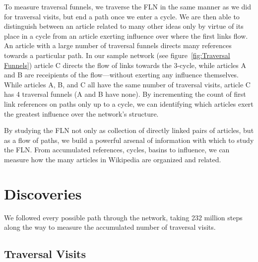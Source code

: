 \documentclass[pre,twocolumn,twoside,superscriptaddress,floatfix, aps, 10pt]{revtex4-1}
\newcommand{\green}[1]{{\leavevmode\color{javagreen}{#1}}} %
\begin{document}
To measure traversal funnels, we traverse the FLN in the same manner as we 
did for traversal visits, but end a path once we enter a cycle.
We are then able to distinguish between an article related to many other ideas
only by virtue of its place in a cycle from an article exerting influence over where the first links flow. 
An article with a large number of traversal funnels directs many references
towards a particular path. In our sample network 
(see figure~\ref{fig:Traversal Funnels}) article C 
directs the flow of links towards the 3-cycle, while articles A and B are 
receipients of the flow---without exerting any influence themselves. 
While articles A, B, and C all have the same number of traversal visits, 
article C has 4 traversal funnels (A and B have none). By incrementing the count of 
first link references on paths only up to a cycle, we can identifying which articles
exert the greatest influence over the network's structure.

By studying the FLN not only as collection of directly linked pairs of articles, but
as a flow of paths, 
we build a powerful arsenal of information with which to study the FLN. 
From accumulated references, cycles, basins to influence, we can measure how the many articles in Wikipedia are organized and related.





\section{Discoveries}

We followed every possible path through the network, taking 232 million steps along the way to measure the accumulated number of traversal visits.

\subsection{Traversal Visits}
\end{document}
